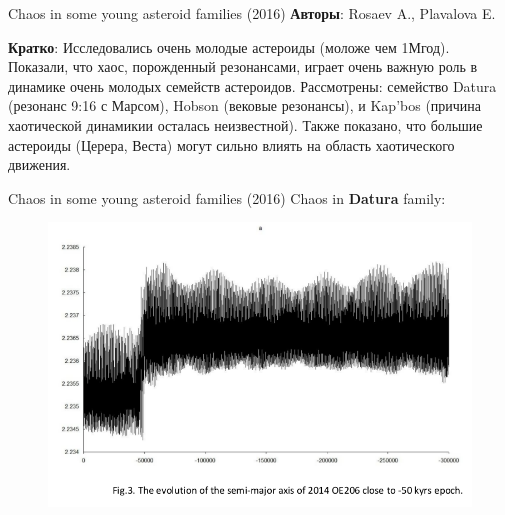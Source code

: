 \documentclass{beamer}
\begin{document}
\begin{frame}{Chaos in some young asteroid families (2016)}
        \textbf{Авторы}: Rosaev A., Plavalova E.

        \textbf{Кратко}: Исследовались очень молодые астероиды (моложе чем 1Мгод). Показали, что хаос, порожденный резонансами, играет очень важную роль в динамике очень молодых семейств астероидов. Рассмотрены: семейство Datura (резонанс 9:16 с Марсом), Hobson (вековые резонансы), и Kap'bos (причина хаотической динамикии осталась неизвестной). Также показано, что большие астероиды (Церера, Веста) могут сильно влиять на область хаотического движения.  

\end{frame}



\begin{frame}{Chaos in some young asteroid families (2016)}
        Chaos in \textbf{Datura} family:
\begin{figure}[h]
\begin{minipage}[h]{0.75\linewidth}
\includegraphics[width=1\linewidth]{./16_1.png}
\end{minipage}
\end{figure}
\end{frame}
\end{document}
